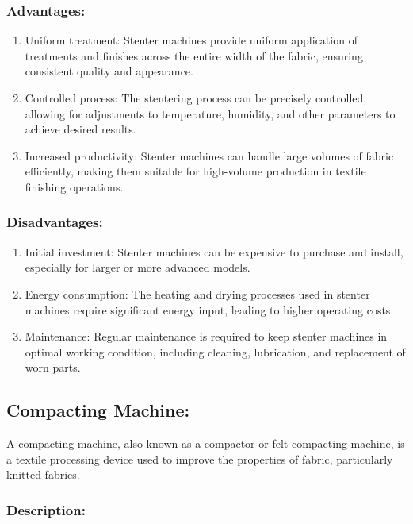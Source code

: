 \subsubsection{Advantages:}

\begin{enumerate}
\item
  Uniform treatment: Stenter machines provide uniform application of
  treatments and finishes across the entire width of the fabric,
  ensuring consistent quality and appearance.
\item
  Controlled process: The stentering process can be precisely
  controlled, allowing for adjustments to temperature, humidity, and
  other parameters to achieve desired results.
\item
  Increased productivity: Stenter machines can handle large volumes of
  fabric efficiently, making them suitable for high-volume production in
  textile finishing operations.
\end{enumerate}

\subsubsection{Disadvantages:}

\begin{enumerate}
\item
  Initial investment: Stenter machines can be expensive to purchase and
  install, especially for larger or more advanced models.
\item
  Energy consumption: The heating and drying processes used in stenter
  machines require significant energy input, leading to higher operating
  costs.
\item
  Maintenance: Regular maintenance is required to keep stenter machines
  in optimal working condition, including cleaning, lubrication, and
  replacement of worn parts.
\end{enumerate}

\subsection{Compacting Machine:}


A compacting machine, also known as a compactor or felt compacting
machine, is a textile processing device used to improve the properties
of fabric, particularly knitted fabrics.


\subsubsection{Description:}


